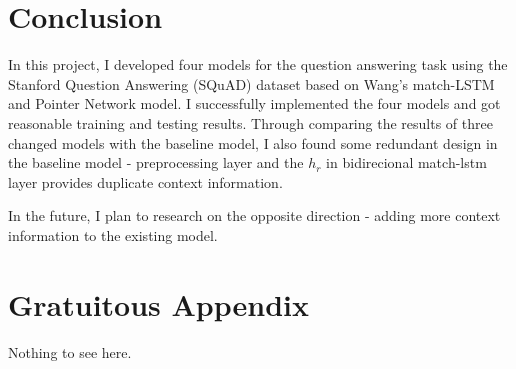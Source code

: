\documentclass[modernstyle,12pt]{sjsuthesis}
\theoremstyle{definition}
\begin{document}
\chapter{Conclusion}

In this project, I developed four models for the question answering task using the Stanford Question Answering (SQuAD) dataset based on Wang's match-LSTM and Pointer Network model. I successfully implemented the four models and got reasonable training and testing results. Through comparing the results of three changed models with the baseline model, I also found some redundant design in the baseline model - preprocessing layer and the $h_r$ in bidirecional match-lstm layer provides duplicate context information.

In the future, I plan to research on the opposite direction - adding more context information to the existing model.



%
%
%







\appendix	%

\chapter{Gratuitous Appendix}
Nothing to see here.

%


\end{document}
